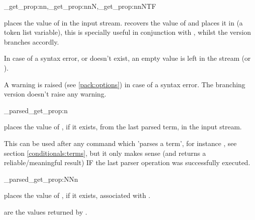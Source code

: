 \documentclass[10pt]{article}
\begin{document}

\begin{codedescribe}{\starray_get_prop:nn,\starray_get_prop:nnN,\starray_get_prop:nnNTF}
\begin{codesyntax}%
\end{codesyntax}
 places the value of  in the input stream.
 recovers the value of  and places it in  (a token list variable), this is specially useful in conjunction with , whilst the  version branches accordly.
\end{codedescribe}
\begin{tsremark}
In case of a syntax error, or  doesn't exist, an empty value is left in the stream (or ).
\end{tsremark}
\begin{tsremark}
A warning is raised (see \ref{pack:options}) in case of a  syntax error. The branching version doesn't raise any warning.
\end{tsremark}


\begin{codedescribe}[code,EXP,new=2023/05/20]{\starray_parsed_get_prop:n}
\begin{codesyntax}%
\end{codesyntax}
 places the value of , if it exists, from the last parsed term, in the input stream. 
\end{codedescribe}
\begin{tsremark}
This can be used after any command which 'parses a term', for instance , see section \ref{conditionals:terms}, but it only makes sense (and returns a reliable/meaningful result) IF the last parser operation was successfully executed.
\end{tsremark}


\begin{codedescribe}[code,EXP,new=2023/11/28]{\starray_parsed_get_prop:NNn}
\begin{codesyntax}%
\end{codesyntax}
 places the value of , if it exists, associated with .
\end{codedescribe}
\begin{tsremark}
 are the values returned by .
\end{tsremark}
\end{document}
